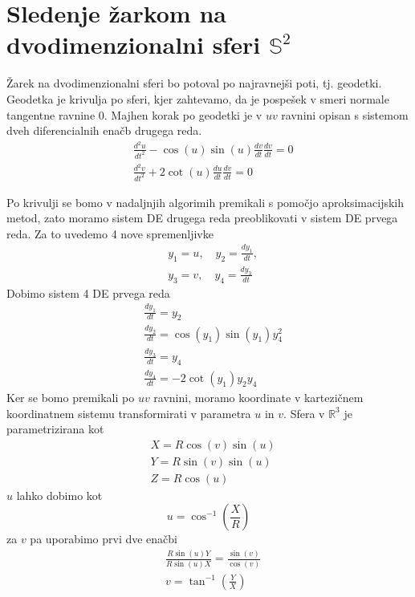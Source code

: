 \documentclass[titlepage]{article}
\begin{document}
\section{\texorpdfstring{Sledenje žarkom na dvodimenzionalni sferi \( \mathbb{S}^2 \)}{Sledenje žarkom na dvodimenzionalni sferi}}
Žarek na dvodimenzionalni sferi bo potoval po najravnejši poti, tj. geodetki. Geodetka je krivulja po sferi, kjer zahtevamo, da je
pospešek v smeri normale tangentne ravnine 0. Majhen korak po geodetki je v \( uv \) ravnini opisan s sistemom dveh diferencialnih enačb drugega reda.
\begin{equation}
    \begin{split}
        &\frac{d^{2}u}{dt^{2}}-\cos(u)\sin(u)\frac{dv}{dt}\frac{dv}{dt}=0 \\
        &\frac{d^{2}v}{dt^{2}}+2\cot(u)\frac{du}{dt}\frac{dv}{dt}=0
    \end{split}
\end{equation}

Po krivulji se bomo v nadaljnjih algorimih premikali s pomočjo aproksimacijskih metod, zato moramo sistem DE drugega reda preoblikovati v
sistem DE prvega reda. Za to uvedemo 4 nove spremenljivke
\begin{equation}
\begin{split}
    &y_{1}=u, \quad y_{2}=\frac{dy_{1}}{dt}, \\
    &y_{3}=v, \quad y_{4}=\frac{dy_{3}}{dt}
\end{split}
\end{equation}
Dobimo sistem 4 DE prvega reda
\begin{equation} \label{e:geoSys}
\begin{split}
    &\frac{dy_{1}}{dt}=y_{2} \\
    &\frac{dy_{2}}{dt}=\cos(y_{1})\sin(y_{1})y^{2}_{4} \\
    &\frac{dy_{3}}{dt}=y_{4} \\
    &\frac{dy_{4}}{dt}=-2\cot(y_{1})y_{2}y_{4}
\end{split}
\end{equation}
Ker se bomo premikali po \( uv \) ravnini, moramo koordinate v kartezičnem koordinatnem sistemu transformirati v parametra \( u \) in \( v \). Sfera v \(\mathbb{R}^3\) je
parametrizirana kot
\begin{equation} \label{e:toXYZ}
    \begin{split}
        &X=R\cos(v)\sin(u) \\
        &Y=R\sin(v)\sin(u) \\
        &Z=R\cos(u)
    \end{split}
\end{equation}
\( u \) lahko dobimo kot
\begin{equation} \label{e:toU}
        u=\cos^{-1} \left( \frac{X}{R} \right)
\end{equation}
za \( v \) pa uporabimo prvi dve enačbi
\begin{equation} \label{e:toV}
    \begin{split}
        &\frac{R\sin(u)Y}{R\sin(u)X}=\frac{\sin(v)}{\cos(v)} \\
        &v=\tan^{-1} \left(\frac{Y}{X} \right)
    \end{split}
\end{equation}
\end{document}
